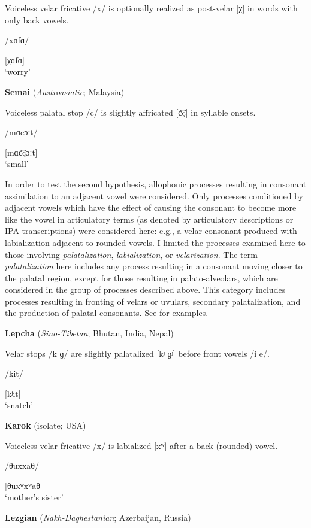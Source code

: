 Voiceless velar fricative /x/ is optionally realized as post-velar [χ] in words with only back vowels.

/xɑfɑ/

[χɑfɑ]\\
\glt ‘worry’
\citep[11]{Poppe1964}
\z

\ea\label{ex:7.5}
  \textbf{Semai} (\textit{Austroasiatic}; Malaysia)

Voiceless palatal stop /c/ is slightly affricated [c͡ç] in syllable onsets.

/mɑcɔːt/

[mɑc͡çɔːt]\\
\glt ‘small’
\citep[5]{Philips2007}
\z

  In order to test the second hypothesis, allophonic processes resulting in consonant assimilation to an adjacent vowel were considered. Only processes conditioned by adjacent vowels which have the effect of causing the consonant to become more like the vowel in articulatory terms (as denoted by articulatory descriptions or IPA transcriptions) were considered here: e.g., a velar consonant produced with labialization adjacent to rounded vowels. I limited the processes examined here to those involving \textit{palatalization}, \textit{labialization}, or \textit{velarization}. The term \textit{palatalization} here includes any process resulting in a consonant moving closer to the palatal region, except for those resulting in palato-alveolars, which are considered in the group of processes described above. This category includes processes resulting in fronting of velars or uvulars, secondary palatalization, and the production of palatal consonants. See  for examples.

\ea\label{ex:7.6}
  \textbf{Lepcha} (\textit{Sino-Tibetan}; Bhutan, India, Nepal)

Velar stops /k ɡ/ are slightly palatalized [kʲ ɡʲ] before front vowels /i e/.

/kit/

[kʲit]\\
\glt ‘snatch’
\citep[21]{Plaisier2007}
\z

\ea\label{ex:7.7}
  \textbf{Karok} (isolate; USA)

Voiceless velar fricative /x/ is labialized [xʷ] after a back (rounded) vowel.

/θuxxaθ/

[θuxʷxʷaθ]\\
\glt ‘mother’s sister’
\citep[8]{Bright1957}
\z

\ea\label{ex:7.8}
  \textbf{Lezgian} (\textit{Nakh-Daghestanian}; Azerbaijan, Russia)

